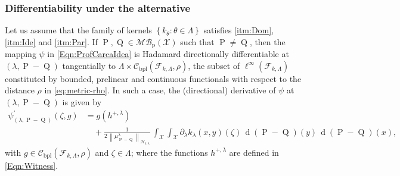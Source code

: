 		\subsubsection*{\color{orange} Differentiability under the alternative}
			\begin{Th}
				Let us assume that the family of kernels $\left\{k_{\theta}:\theta\in\Lambda\right\}$ satisfies \ref{itm:Dom}, \ref{itm:Ide} and \ref{itm:Par}. If $\operatorname{P},\operatorname{Q}\in\mathcal{MB}_{\operatorname{p}}(\mathcal{X})$ such that $\operatorname{P}\neq\operatorname{Q}$, then the mapping $\psi$ in \eqref{Eqn:ProfCarcaIdea} is Hadamard directionally differentiable at $(\lambda,\operatorname{P}-\operatorname{Q})$ tangentially to $\Lambda\times\mathcal{C}_{\operatorname{bpl}}\left(\mathcal{F}_{k,\Lambda},\rho\right)$,
				{\color{orange}the subset of $\ell^{\infty}\left(\mathcal{F}_{k,\Lambda}\right)$ constituted by bounded, prelinear and continuous functionals with respect to the distance $\rho$ in \eqref{eq:metric-rho}}. In such a case, the (directional) derivative of $\psi$ at $(\lambda,\operatorname{P}-\operatorname{Q})$ is given by
				\begin{equation}\label{Eqn:psi_prime1}
					\begin{aligned}
						\psi_{(\lambda,\operatorname{P}-\operatorname{Q})}^{\prime}(\zeta,g)&=g\left(h^{+,\lambda}\right)
						\\
						&\quad+\frac{1}{2\,\left\|\mu_{\operatorname{P}-\operatorname{Q}}^{\lambda}\right\|_{\mathcal{H}_{k,\lambda}}}\,\int_{\mathcal{X}}\int_{\mathcal{X}}\partial_{\lambda}k_{\lambda}(x,y)(\zeta)\,\operatorname{d}(\operatorname{P}-\operatorname{Q})(y)\,\operatorname{d}(\operatorname{P}-\operatorname{Q})(x),
					\end{aligned}
				\end{equation}
				with $g\in\mathcal{C}_{\operatorname{bpl}}\left(\mathcal{F}_{k,\Lambda},\rho\right)$ and $\zeta\in\Lambda$; where the functions $h^{+,\lambda}$ are defined in \eqref{Eqn:Witness}.
			\end{Th}
